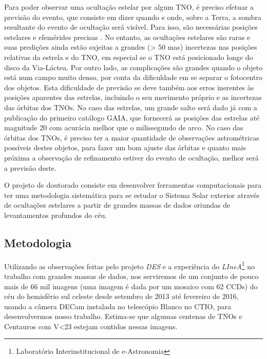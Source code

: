 \documentclass[a4paper, 11pt]{article}
\begin{document}
Para poder observar uma oculta\c{c}\~ao estelar por algum TNO, \'e preciso efetuar a previs\~ao do evento, que consiste em dizer quando e onde, sobre a Terra, a sombra resultante do evento de ocultação será visível. Para isso, são necessárias posições estelares e efemérides precisas \citep{2010A&A...515A..32A, 2012A&A...541A.142A, 2014A&A...561A..37C}. No entanto, as ocultações estelares são raras e suas predições ainda estão sujeitas a grandes (> 50 mas) incertezas nas posições relativas da estrela e do TNO, em especial se o TNO est\'a posicionado longe do disco da Via-L\'actea. Por outro lado, as complicações são grandes quando o objeto está num campo muito denso, por conta da dificuldade em se separar o fotocentro dos objetos. Esta dificuldade de previs\~ao se deve tamb\'em aos erros inerentes \`as posi\c{c}\~oes aparentes das estrelas, incluindo o seu movimento pr\'oprio e as incertezas das \'orbitas dos TNOs. No caso das estrelas, um grande salto será dado já com a publicação do primeiro catálogo GAIA, que fornecerá as posi\c{c}\~oes das estrelas at\'e magnitude 20 com acurácia melhor que o milissegundo de arco. No caso das \'orbitas dos TNOs, \'e preciso ter a maior quantidade de observa\c{c}\~oes astrom\'etricas poss\'iveis destes objetos, para fazer um bom ajuste das \'orbitas e quanto mais pr\'oxima a observa\c{c}\~ao de refinamento estiver do evento de oculta\c{c}\~ao, melhor ser\'a a previs\~ao deste.

O projeto de doutorado consiste em desenvolver ferramentas computacionais para ter uma metodologia sistem\'atica para se estudar o Sistema Solar exterior através de ocultações estelares a partir de grandes massas de dados oriundas de levantamentos profundos do céu.

\subsection{Metodologia}

Utilizando as observa\c{c}\~oes feitas pelo projeto \textit{DES} e a experi\^encia do \textit{LIneA}\footnote{Laborat\'orio Interinstitucional de e-Astronomia} no trabalho com grandes massas de dados, nos serviremos de um conjunto de pouco mais de 66 mil imagens (uma imagem \'e dada por um mosaico com 62 CCDs) do c\'eu do hemisf\'erio sul celeste desde setembro de 2013 at\'e fevereiro de 2016, usando a c\^amera DECam instalada no telescópio Blanco no CTIO, para desenvolvermos nosso trabalho. Estima-se que algumas centenas de TNOs e Centauros com V<23 estejam contidos nessas imagens.
\end{document}
